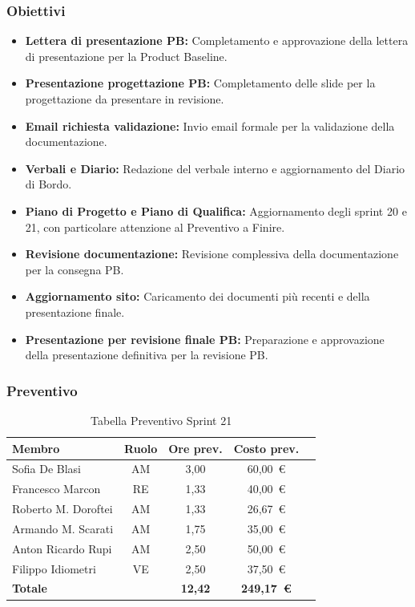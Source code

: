 \subsubsection{Obiettivi}
\begin{itemize}
    \item \textbf{Lettera di presentazione PB:} Completamento e approvazione della lettera di presentazione per la Product Baseline.
    \item \textbf{Presentazione progettazione PB:} Completamento delle slide per la progettazione da presentare in revisione.
    \item \textbf{Email richiesta validazione:} Invio email formale per la validazione della documentazione.
    \item \textbf{Verbali e Diario:} Redazione del verbale interno e aggiornamento del Diario di Bordo.
    \item \textbf{Piano di Progetto e Piano di Qualifica:} Aggiornamento degli sprint 20 e 21, con particolare attenzione al Preventivo a Finire.
    \item \textbf{Revisione documentazione:} Revisione complessiva della documentazione per la consegna PB.
    \item \textbf{Aggiornamento sito:} Caricamento dei documenti più recenti e della presentazione finale.
    \item \textbf{Presentazione per revisione finale PB:} Preparazione e approvazione della presentazione definitiva per la revisione PB.
\end{itemize}

\subsubsection{Preventivo}
\begin{table}[H]
    \centering
    \renewcommand{\arraystretch}{1.3}
    \begin{tabularx}{\textwidth}{|X|c|c|c|r|}
        \hline
        \textbf{Membro} & \textbf{Ruolo} & \textbf{Ore prev.} & \textbf{Costo prev.} \\
        \hline
        Sofia De Blasi       & AM & 3,00 &  60{,}00~\euro \\
        Francesco Marcon     & RE & 1,33 &  40{,}00~\euro \\
        Roberto M. Doroftei  & AM & 1,33 &  26{,}67~\euro \\
        Armando M. Scarati   & AM & 1,75 &  35{,}00~\euro \\
        Anton Ricardo Rupi   & AM & 2,50 &  50{,}00~\euro \\
        Filippo Idiometri    & VE & 2,50 &  37{,}50~\euro \\
        \hline
        \textbf{Totale}      &    & \textbf{12,42} & \textbf{249{,}17~\euro} \\
        \hline
    \end{tabularx}
    \caption{Tabella Preventivo Sprint 21}
\end{table}

